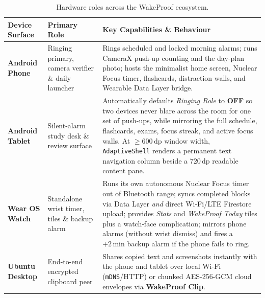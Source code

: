 \documentclass[11pt,a4paper]{article}
\begin{document}
\begin{table}[ht!]
\centering
\small
\begin{tabularx}{\textwidth}{@{}L{3.1cm}L{3.3cm}Y@{}}
\toprule
\textbf{\sffamily Device Surface} & \textbf{\sffamily Primary Role} & \textbf{\sffamily Key Capabilities \& Behaviour} \\
\midrule
\textbf{Android Phone}  &
Ringing primary, camera verifier \& daily launcher &
Rings scheduled and locked morning alarms; runs CameraX push-up counting and the day-plan photo; hosts the minimalist home screen, Nuclear Focus timer, flashcards, distraction walls, and Wearable Data Layer bridge. \\
\addlinespace[4pt]
\textbf{Android Tablet}  &
Silent-alarm study desk \& review surface &
Automatically defaults \emph{Ringing Role} to \textbf{OFF} so two devices never blare across the room for one set of push-ups, while mirroring the full schedule, flashcards, exams, focus streak, and active focus walls. At $\ge 600\,\text{dp}$ window width, \texttt{AdaptiveShell} renders a permanent text navigation column beside a $720\,\text{dp}$ readable content pane. \\
\addlinespace[4pt]
\textbf{Wear OS Watch}  &
Standalone wrist timer, tiles \& backup alarm &
Runs its own autonomous Nuclear Focus timer out of Bluetooth range; syncs completed blocks via Data Layer \emph{and} direct Wi-Fi/LTE Firestore upload; provides \emph{Stats} and \emph{WakeProof Today} tiles plus a watch-face complication; mirrors phone alarms (without wrist dismiss) and fires a $+2\,\text{min}$ backup alarm if the phone fails to ring. \\
\addlinespace[4pt]
\textbf{Ubuntu Desktop}  &
End-to-end encrypted clipboard peer &
Shares copied text and screenshots instantly with the phone and tablet over local Wi-Fi (\texttt{mDNS}/HTTP) or chunked AES-256-GCM cloud envelopes via \textbf{WakeProof Clip}. \\
\bottomrule
\end{tabularx}
\caption{Hardware roles across the WakeProof ecosystem.}
\end{table}
\end{document}
